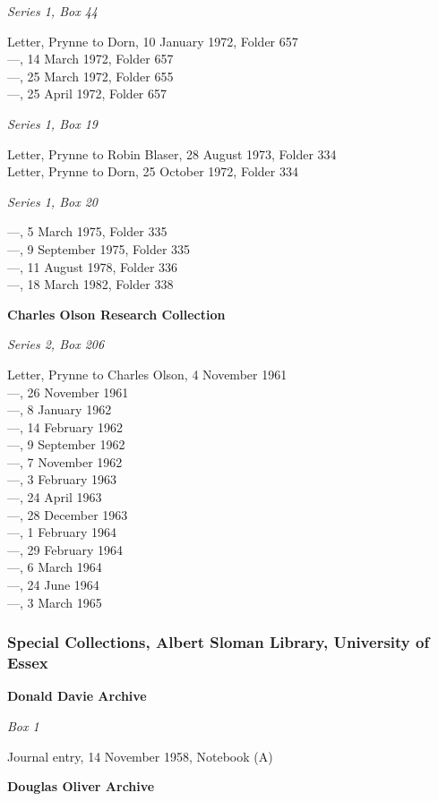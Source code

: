 \documentclass[]{article}
\begin{document}
\emph{Series 1, Box 44}

Letter, Prynne to Dorn, 10 January 1972, Folder 657\\
—, 14 March 1972, Folder 657\\
—, 25 March 1972, Folder 655\\
—, 25 April 1972, Folder 657

\emph{Series 1, Box 19}

Letter, Prynne to Robin Blaser, 28 August 1973, Folder 334\\
Letter, Prynne to Dorn, 25 October 1972, Folder 334

\emph{Series 1, Box 20}

—, 5 March 1975, Folder 335\\
—, 9 September 1975, Folder 335\\
—, 11 August 1978, Folder 336\\
—, 18 March 1982, Folder 338

\textbf{Charles Olson Research Collection}

\emph{Series 2, Box 206}

Letter, Prynne to Charles Olson, 4 November 1961\\
—, 26 November 1961\\
—, 8 January 1962\\
—, 14 February 1962\\
—, 9 September 1962\\
—, 7 November 1962\\
—, 3 February 1963\\
—, 24 April 1963\\
—, 28 December 1963\\
—, 1 February 1964\\
—, 29 February 1964\\
—, 6 March 1964\\
—, 24 June 1964\\
—, 3 March 1965

\subsubsection{Special Collections, Albert Sloman Library, University of
Essex}\label{special-collections-albert-sloman-library-university-of-essex}

\textbf{Donald Davie Archive}

\emph{Box 1}

Journal entry, 14 November 1958, Notebook (A)

\textbf{Douglas Oliver Archive}
\end{document}
